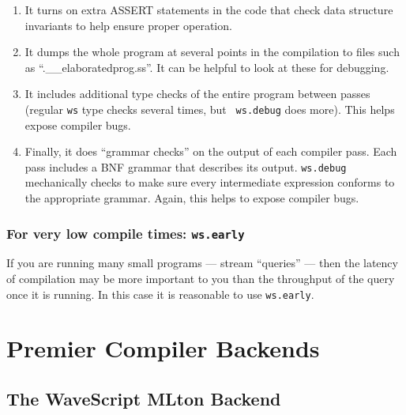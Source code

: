 \documentclass[twocolumn]{report}
\begin{document}
\begin{enumerate}
\item It turns on extra ASSERT statements in the code that check data
structure invariants to help ensure proper operation.

\item It dumps the whole program at several points in the
  compilation to files such as ``.\_\_elaboratedprog.ss''.  It can be
  helpful to look at these for debugging.

\item It includes additional type checks of the entire program between
  passes (regular {\tt ws} type checks several times, but {\tt
  ws.debug} does more).  This helps expose compiler bugs.

\item Finally, it does ``grammar checks'' on the output of each compiler
  pass. Each pass includes a BNF grammar that describes its output.
  {\tt ws.debug} mechanically checks to make sure every intermediate
  expression conforms to the appropriate grammar.  Again, this helps
  to expose compiler bugs.
\end{enumerate}


\subsubsection*{For very low compile times: {\tt \bf ws.early}}

If you are running many small programs --- stream ``queries'' --- then
the latency of compilation may be more important to you than the
throughput of the query once it is running.  In this case it is
reasonable to use {\tt ws.early}.



\section{Premier Compiler Backends}

\subsection{The WaveScript MLton Backend}
\end{document}
